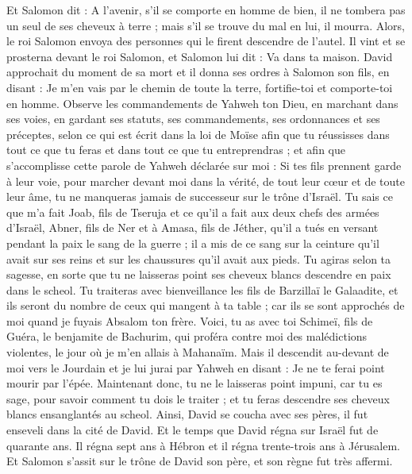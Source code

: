 \begin{multicols}{2}
Et Salomon dit : A l'avenir, s'il se comporte en homme de bien, il ne tombera pas un seul de ses cheveux à terre ; mais s'il se trouve du mal en lui, il mourra.
Alors, le roi Salomon envoya des personnes qui le firent descendre de l'autel. Il vint et se prosterna devant le roi Salomon, et Salomon lui dit : Va dans ta maison.
\VerseOne{}David approchait du moment de sa mort et il donna ses ordres à Salomon son fils, en disant :
Je m'en vais par le chemin de toute la terre, fortifie-toi et comporte-toi en homme.
Observe les commandements de Yahweh ton Dieu, en marchant dans ses voies, en gardant ses statuts, ses commandements, ses ordonnances et ses préceptes, selon ce qui est écrit dans la loi de Moïse afin que tu réussisses dans tout ce que tu feras et dans tout ce que tu entreprendras ;
et afin que s'accomplisse cette parole de Yahweh déclarée sur moi : Si tes fils prennent garde à leur voie, pour marcher devant moi dans la vérité, de tout leur cœur et de toute leur âme, tu ne manqueras jamais de successeur sur le trône d'Israël.
Tu sais ce que m'a fait Joab, fils de Tseruja et ce qu'il a fait aux deux chefs des armées d'Israël, Abner, fils de Ner et à Amasa, fils de Jéther, qu'il a tués en versant pendant la paix le sang de la guerre ; il a mis de ce sang sur la ceinture qu'il avait sur ses reins et sur les chaussures qu'il avait aux pieds.
Tu agiras selon ta sagesse, en sorte que tu ne laisseras point ses cheveux blancs descendre en paix dans le scheol.
Tu traiteras avec bienveillance les fils de Barzillaï le Galaadite, et ils seront du nombre de ceux qui mangent à ta table ; car ils se sont approchés de moi quand je fuyais Absalom ton frère.
Voici, tu as avec toi Schimeï, fils de Guéra, le benjamite de Bachurim, qui proféra contre moi des malédictions violentes, le jour où je m'en allais à Mahanaïm. Mais il descendit au-devant de moi vers le Jourdain et je lui jurai par Yahweh en disant : Je ne te ferai point mourir par l'épée.
Maintenant donc, tu ne le laisseras point impuni, car tu es sage, pour savoir comment tu dois le traiter ; et tu feras descendre ses cheveux blancs ensanglantés au scheol.
Ainsi, David se coucha avec ses pères, il fut enseveli dans la cité de David.
Et le temps que David régna sur Israël fut de quarante ans. Il régna sept ans à Hébron et il régna trente-trois ans à Jérusalem.
Et Salomon s'assit sur le trône de David son père, et son règne fut très affermi.

\end{multicols}
